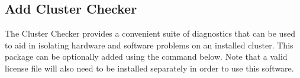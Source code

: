 \subsection{Add Cluster Checker} \label{sec:add_clck}

The \Intel{} Cluster Checker provides a convenient suite of diagnostics that
can be used to aid in isolating hardware and software problems on an installed
cluster. This package can be optionally added using the command below. Note
that a valid license file will also need to be installed separately in order to
use this software.
